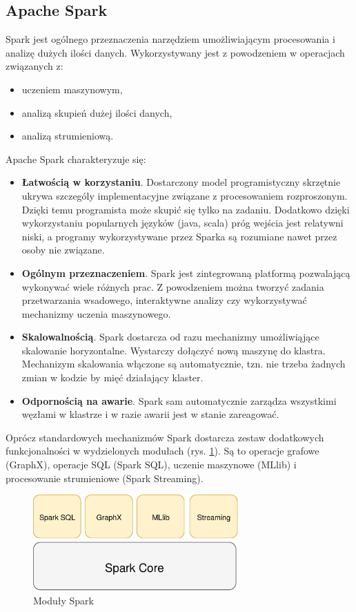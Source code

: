 \subsection{Apache Spark}
Spark jest ogólnego przeznaczenia narzędziem umożliwiającym procesowania
i analizę dużych ilości danych.
Wykorzystywany jest z powodzeniem w operacjach związanych z:
\begin{itemize}
  \item uczeniem maszynowym,
  \item analizą skupień dużej ilości danych,
  \item analizą strumieniową.
\end{itemize}
Apache Spark charakteryzuje się:
\begin{itemize}
  \item \textbf{Łatwością w korzystaniu}.
  Dostarczony model programistyczny skrzętnie ukrywa szczególy implementacyjne związane z procesowaniem rozproszonym.
  Dzięki temu programista może skupić się tylko na zadaniu.
  Dodatkowo dzięki wykorzystaniu popularnych języków (java, scala) próg wejścia jest relatywni niski,
  a programy wykorzystywane przez Sparka są rozumiane nawet przez osoby nie związane.
  \item \textbf{Ogólnym przeznaczeniem}.
  Spark jest zintegrowaną platformą pozwalającą wykonywać wiele różnych prac.
  Z powodzeniem można tworzyć zadania przetwarzania wsadowego,
  interaktywne analizy czy wykorzystywać mechanizmy uczenia maszynowego.
  \item \textbf{Skalowalnością}.
  Spark dostarcza od razu mechanizmy umożliwiąjące skalowanie horyzontalne.
  Wystarczy dołączyć nową maszynę do klastra.
  Mechanizym skalowania włączone są automatycznie,
  tzn. nie trzeba żadnych zmian w kodzie by mięć działający klaster.
  \item \textbf{Odpornością na awarie}.
  Spark sam automatycznie zarządza wszystkimi węzłami w klastrze
  i w razie awarii jest w stanie zareagować.
\end{itemize}

Oprócz standardowych mechanizmów Spark dostarcza zestaw dodatkowych funkcjonalności
w wydzielonych modułach (rys. \ref{fig:SparkModules}).
Są to operacje grafowe (GraphX), operacje SQL (Spark SQL), uczenie maszynowe (MLlib)
i procesowanie strumieniowe (Spark Streaming).
\begin{figure}[htbp]
  \centering
  \includegraphics[width=0.7\textwidth]{img/sparkModules}
  \caption{Moduły Spark}
  \label{fig:SparkModules}
\end{figure}

